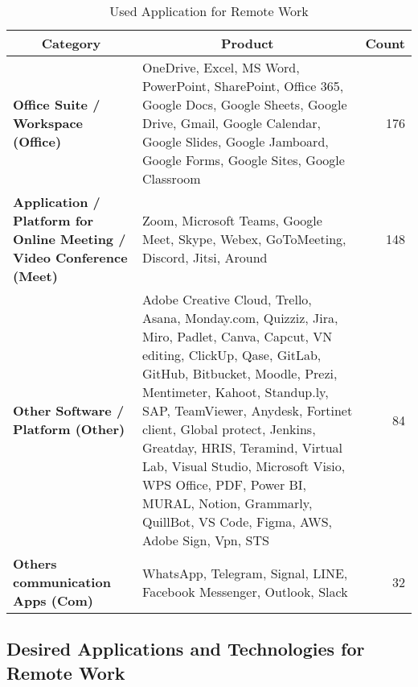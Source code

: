 \documentclass[conference]{IEEEtran}
\begin{document}
\begin{table*}
	\caption{Used Application for Remote Work}
	\label{Used Application for Remote Work}
	\begin{tabular}{|p{}|p{}|r|}
		\hline
		\multicolumn{1}{|c|}{\textbf{Category}}                                            & \multicolumn{1}{c|}{\textbf{Product}}                                                 & \multicolumn{1}{c|}{\textbf{Count}} \\ \hline
		\textbf{Office Suite / Workspace (Office)} &
		OneDrive, Excel, MS Word, PowerPoint, SharePoint, Office 365, Google Docs, Google Sheets, Google Drive, Gmail, Google Calendar, Google Slides, Google Jamboard, Google Forms, Google Sites, Google Classroom & 176 %
		\\ \hline
		\textbf{Application / Platform for Online Meeting / Video Conference (Meet)} &
		Zoom, Microsoft Teams, Google Meet, Skype, Webex, GoToMeeting, Discord, Jitsi, Around & 148 %
		\\ \hline
		\textbf{Other Software / Platform (Other)} & Adobe Creative Cloud, Trello, Asana, Monday.com, Quizziz, Jira, Miro, Padlet, Canva, Capcut, VN editing, ClickUp, Qase, GitLab, GitHub, Bitbucket, Moodle, Prezi, Mentimeter, Kahoot, Standup.ly, SAP, TeamViewer, Anydesk, Fortinet client, Global protect, Jenkins, Greatday, HRIS, Teramind, Virtual Lab, Visual Studio, Microsoft Visio, WPS Office, PDF, Power BI, MURAL, Notion, Grammarly, QuillBot, VS Code, Figma, AWS, Adobe Sign, Vpn, STS & 84 %
		\\ \hline
		\textbf{Others communication Apps (Com)}                                        & WhatsApp, Telegram, Signal, LINE, Facebook Messenger, Outlook, Slack & 32 %
		\\ \hline
	\end{tabular}
\end{table*}


\subsection{Desired Applications and Technologies for Remote Work}
\label{sec:desired-apps}
\end{document}
